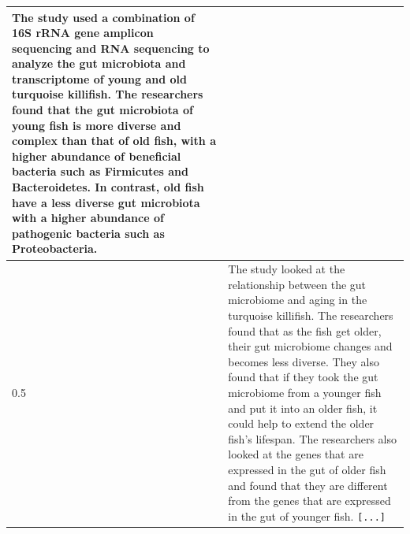 \begin{table}[]
\begin{tabular}{l|p{}}
The study used a combination of 16S rRNA gene amplicon sequencing and RNA sequencing to analyze the gut microbiota and transcriptome of young and old turquoise killifish. The researchers found that the gut microbiota of young fish is more diverse and complex than that of old fish, with a higher abundance of beneficial bacteria such as Firmicutes and Bacteroidetes. In contrast, old fish have a less diverse gut microbiota with a higher abundance of pathogenic bacteria such as Proteobacteria. \\ \hline
0.5 & The study looked at the relationship between the gut microbiome and aging in the turquoise killifish. The researchers found that as the fish get older, their gut microbiome changes and becomes less diverse. They also found that if they took the gut microbiome from a younger fish and put it into an older fish, it could help to extend the older fish's lifespan. The researchers also looked at the genes that are expressed in the gut of older fish and found that they are different from the genes that are expressed in the gut of younger fish. \texttt{[...]}

\end{tabular}
\end{table}
